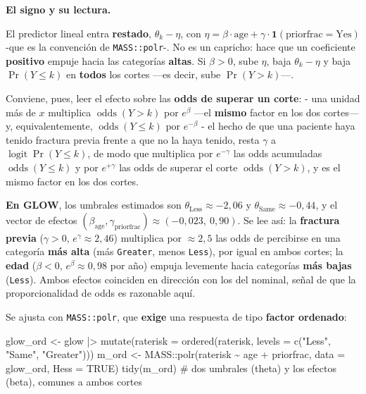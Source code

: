 \documentclass[
  letterpaper,
  DIV=11,
  numbers=noendperiod]{scrartcl}
\newenvironment{Shaded}{\begin{snugshade}}{\end{snugshade}}
\newcommand{\AttributeTok}[1]{\textcolor[rgb]{0.40,0.45,0.13}{#1}}
\newcommand{\CommentTok}[1]{\textcolor[rgb]{0.37,0.37,0.37}{#1}}
\newcommand{\ConstantTok}[1]{\textcolor[rgb]{0.56,0.35,0.01}{#1}}
\newcommand{\FunctionTok}[1]{\textcolor[rgb]{0.28,0.35,0.67}{#1}}
\newcommand{\NormalTok}[1]{\textcolor[rgb]{0.00,0.23,0.31}{#1}}
\newcommand{\OtherTok}[1]{\textcolor[rgb]{0.00,0.23,0.31}{#1}}
\newcommand{\SpecialCharTok}[1]{\textcolor[rgb]{0.37,0.37,0.37}{#1}}
\newcommand{\StringTok}[1]{\textcolor[rgb]{0.13,0.47,0.30}{#1}}
\begin{document}
\textbf{El signo y su lectura.}

El predictor lineal entra \textbf{restado}, \(\theta_k-\eta\), con
\(\eta=\beta \cdot\text{age}+\gamma \cdot \mathbf1(\text{priorfrac}=\text{Yes})\)
-que es la convención de \texttt{MASS::polr}-. No es un capricho: hace
que un coeficiente \textbf{positivo} empuje hacia las categorías
\textbf{altas}. Si \(\beta>0\), sube \(\eta\), baja \(\theta_k-\eta\) y
baja \(\Pr(Y\le k)\) en \textbf{todos} los cortes ---es decir, sube
\(\Pr(Y>k)\)---.

Conviene, pues, leer el efecto sobre las \textbf{odds de superar un
corte}: - una unidad más de \(x\) multiplica
\(\operatorname{odds}(Y>k)\) por \(e^{\beta}\) ---el \textbf{mismo}
factor en los dos cortes--- y, equivalentemente,
\(\operatorname{odds}(Y\le k)\) por \(e^{-\beta}\) - el hecho de que una
paciente haya tenido fractura previa frente a que no la haya tenido,
resta \(\gamma\) a \(\operatorname{logit}\Pr(Y\le k)\), de modo que
multiplica por \(e^{-\gamma}\) las odds acumuladas
\(\operatorname{odds}(Y\le k)\) y por \(e^{+\gamma}\) las odds de
superar el corte \(\operatorname{odds}(Y>k)\), y es el mismo factor en
los dos cortes.

\textbf{En GLOW}, los umbrales estimados son
\(\theta_{\text{Less}}\approx-2{,}06\) y
\(\theta_{\text{Same}}\approx-0{,}44\), y el vector de efectos
\((\beta_{\text{age}},\gamma_{\text{priorfrac}})\approx(-0{,}023,\ 0{,}90)\).
Se lee así: la \textbf{fractura previa} (\(\gamma>0\),
\(e^{\gamma}\approx 2{,}46\)) multiplica por \(\approx 2{,}5\) las odds
de percibirse en una categoría \textbf{más alta} (más \texttt{Greater},
menos \texttt{Less}), por igual en ambos cortes; la \textbf{edad}
(\(\beta<0\), \(e^{\beta}\approx 0{,}98\) por año) empuja levemente
hacia categorías \textbf{más bajas} (\texttt{Less}). Ambos efectos
coinciden en dirección con los del nominal, señal de que la
proporcionalidad de odds es razonable aquí.

Se ajusta con \texttt{MASS::polr}, que \textbf{exige} una respuesta de
tipo \textbf{factor ordenado}:

\begin{Shaded}
\begin{Highlighting}[]
\NormalTok{glow\_ord }\OtherTok{\textless{}{-}}\NormalTok{ glow }\SpecialCharTok{|\textgreater{}}
  \FunctionTok{mutate}\NormalTok{(}\AttributeTok{raterisk =} \FunctionTok{ordered}\NormalTok{(raterisk, }\AttributeTok{levels =} \FunctionTok{c}\NormalTok{(}\StringTok{"Less"}\NormalTok{, }\StringTok{"Same"}\NormalTok{, }\StringTok{"Greater"}\NormalTok{)))}
\NormalTok{m\_ord }\OtherTok{\textless{}{-}}\NormalTok{ MASS}\SpecialCharTok{::}\FunctionTok{polr}\NormalTok{(raterisk }\SpecialCharTok{\textasciitilde{}}\NormalTok{ age }\SpecialCharTok{+}\NormalTok{ priorfrac, }\AttributeTok{data =}\NormalTok{ glow\_ord, }\AttributeTok{Hess =} \ConstantTok{TRUE}\NormalTok{)}
\FunctionTok{tidy}\NormalTok{(m\_ord)        }\CommentTok{\# dos umbrales (theta) y los efectos (beta), comunes a ambos cortes}
\end{Highlighting}
\end{Shaded}
\end{document}
